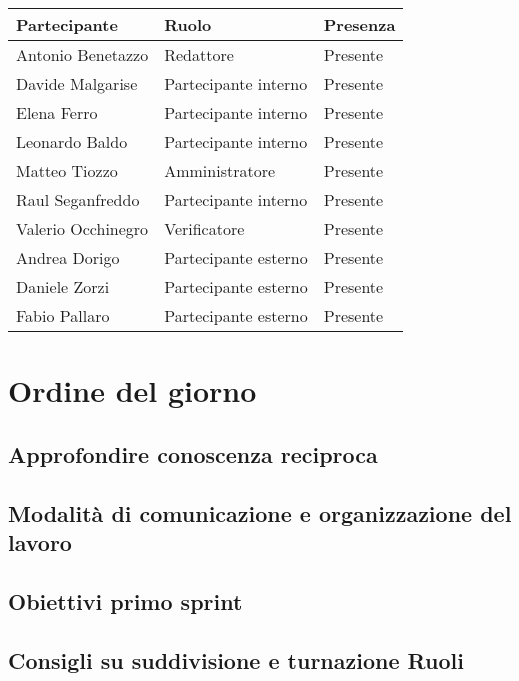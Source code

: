 \documentclass[italian,12pt]{article}
\begin{document}
\begin{flushleft}
	\begin{table}[!h]
	\begin{tabular}{ |l|l|l| } 
		\hline
		\textbf{Partecipante} & \textbf{Ruolo}       & \textbf{Presenza} \\
		\hline 
		Antonio Benetazzo     & Redattore            & Presente          \\
		Davide Malgarise      & Partecipante interno & Presente          \\
		Elena Ferro           & Partecipante interno & Presente          \\
		Leonardo Baldo        & Partecipante interno & Presente          \\
		Matteo Tiozzo         & Amministratore       & Presente          \\
		Raul Seganfreddo      & Partecipante interno & Presente          \\
		Valerio Occhinegro    & Verificatore         & Presente          \\
		Andrea Dorigo         & Partecipante esterno & Presente          \\
		Daniele Zorzi         & Partecipante esterno & Presente          \\
		Fabio Pallaro         & Partecipante esterno & Presente          \\
		\hline
	\end{tabular}
	\end{table}
\end{flushleft}

\section{Ordine del giorno}
\subsection{Approfondire conoscenza reciproca}
\subsection{Modalità di comunicazione e organizzazione del lavoro}
\subsection{Obiettivi primo sprint}
\subsection{Consigli su suddivisione e turnazione Ruoli}
\end{document}
